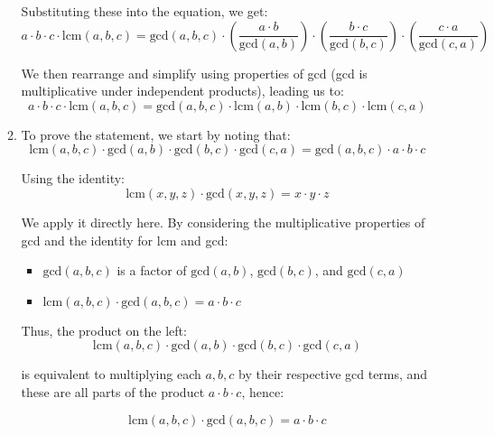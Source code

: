 \documentclass[a4paper]{article}
\begin{document}
\begin{enumerate}
\begin{enumerate}
            Substituting these into the equation, we get:
            \[
                a \cdot b \cdot c \cdot \text{lcm}(a, b, c) = \text{gcd}(a, b, c) \cdot \left( \frac{a \cdot b}{\text{gcd}(a, b)} \right) \cdot \left( \frac{b \cdot c}{\text{gcd}(b, c)} \right) \cdot \left( \frac{c \cdot a}{\text{gcd}(c, a)} \right)
            \]

            We then rearrange and simplify using properties of gcd (gcd is multiplicative under independent products), leading us to:
            \[
                a \cdot b \cdot c \cdot \text{lcm}(a, b, c) = \text{gcd}(a, b, c) \cdot \text{lcm}(a, b) \cdot \text{lcm}(b, c) \cdot \text{lcm}(c, a)
            \]

            \item To prove the statement, we start by noting that:
            \[
                \text{lcm}(a, b, c) \cdot \text{gcd}(a, b) \cdot \text{gcd}(b, c) \cdot \text{gcd}(c, a) = \text{gcd}(a, b, c) \cdot a \cdot b \cdot c
            \]

            Using the identity:
            \[
                \text{lcm}(x, y, z) \cdot \text{gcd}(x, y, z) = x \cdot y \cdot z
            \]

            We apply it directly here. By considering the multiplicative properties of gcd and the identity for lcm and gcd:
            \begin{itemize}
                \item \(\text{gcd}(a, b, c)\) is a factor of \(\text{gcd}(a, b)\), \(\text{gcd}(b, c)\), and \(\text{gcd}(c, a)\)
                \item \(\text{lcm}(a, b, c) \cdot \text{gcd}(a, b, c) = a \cdot b \cdot c\)
            \end{itemize}

            Thus, the product on the left:
            \[
                \text{lcm}(a, b, c) \cdot \text{gcd}(a, b) \cdot \text{gcd}(b, c) \cdot \text{gcd}(c, a)
            \]

            is equivalent to multiplying each \(a, b, c\) by their respective gcd terms, and these are all parts of the product \(a \cdot b \cdot c\), hence:

            \[
                \text{lcm}(a, b, c) \cdot \text{gcd}(a, b, c) = a \cdot b \cdot c
            \]
        \end{enumerate}


\end{enumerate}
\end{document}

